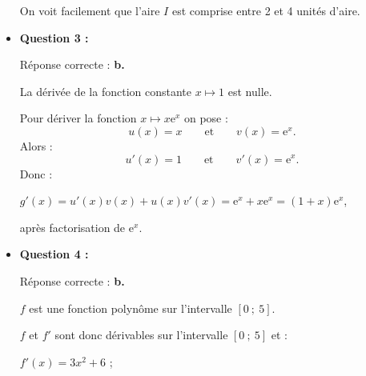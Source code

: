 \begin{corrige}
\begin{itemize}
\begin{center}
\end{center}
          \par
          On voit facilement que l'aire $I$ est comprise entre 2 et 4 unités d'aire.
          \par
          \par
          \item \textbf{Question 3 :}
          \par
          Réponse correcte :\quad\textbf{ b.}
          \par
          La dérivée de la fonction constante $x \longmapsto 1$ est nulle.
          \par
          Pour dériver la fonction $x \longmapsto x \text{e}^{x}$ on pose :
          \[ u(x)=x  \qquad \text{et} \qquad v(x)=\text{e}^{x}. \]
          Alors :
          \[ u'(x)=1 \qquad \text{et} \qquad  v'(x)=\text{e}^{x}. \]
          Donc :
          \par
          $g'(x)=u'(x)v(x)+u(x)v'(x)=\text{e}^{x}+x \text{e}^{x}=(1+x)\text{e}^{x}$,
          \par
          après factorisation de $\text{e}^{x}$.
          \par
          \item \textbf{Question 4 :}
          \par
          Réponse correcte :\quad\textbf{ b.}
          \par
          $f$ est une fonction polynôme sur l'intervalle $[0~;~5]$.
          \par
          $f$ et $f'$ sont donc dérivables sur l'intervalle $[0~;~5]$ et :
          \par
          $f'(x)=3x^2+6$ ;

\end{itemize}
\end{corrige}
